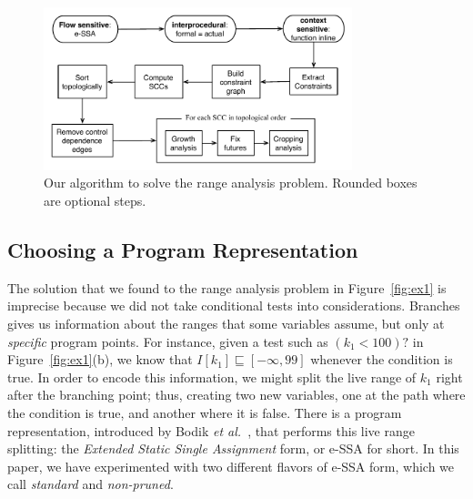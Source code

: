 \documentclass{llncs}
\begin{document}
\begin{figure}[t!]
\begin{center}
\includegraphics[width=0.8\textwidth]{images/algorithm}
\end{center}
\caption{\label{fig:algorithm}
Our algorithm to solve the range analysis problem.
Rounded boxes are optional steps.}
\end{figure}

\subsection{Choosing a Program Representation}
\label{sub:rep}

The solution that we found to the range analysis problem in Figure~\ref{fig:ex1}
is imprecise because we did not take conditional tests into considerations.
Branches gives us information about the ranges that some variables assume, but
only at {\em specific} program points.
For instance, given a test such as $(k_1 < 100)?$ in  Figure~\ref{fig:ex1}(b),
we know that $I[k_1] \sqsubseteq [-\infty, 99]$ whenever the condition is true.
In order to encode this information, we might split the live range of $k_1$
right after the branching point; thus, creating two new variables, one at the
path where the condition is true, and another where it is false.
There is a program representation, introduced by Bodik
{\em et al.}~\cite{Bodik00}, that performs this live range splitting:
the {\em Extended Static Single Assignment} form, or e-SSA for short.
In this paper, we have experimented with two different flavors of e-SSA form,
which we call {\em standard} and {\em non-pruned}.
\end{document}
